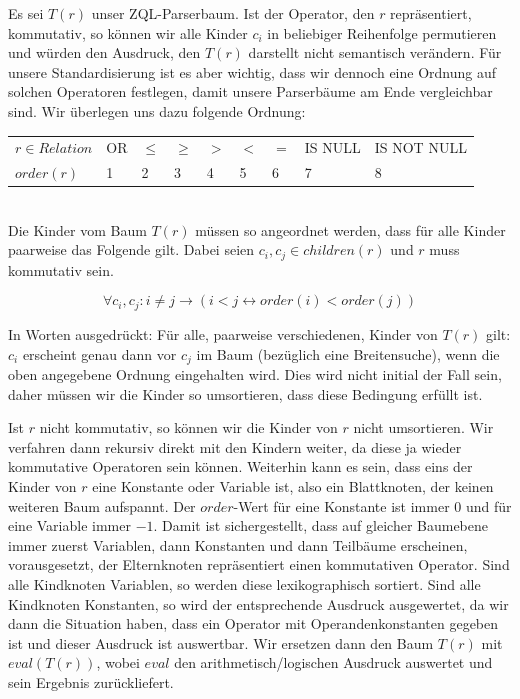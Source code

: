 Es sei $T(r)$ unser ZQL-Parserbaum. Ist der Operator, den $r$ repräsentiert, kommutativ, so können wir alle Kinder $c_i$ in beliebiger Reihenfolge permutieren und würden den Ausdruck, den $T(r)$ darstellt nicht semantisch verändern. Für unsere Standardisierung ist es aber wichtig, dass wir dennoch eine Ordnung auf solchen Operatoren festlegen, damit unsere Parserbäume am Ende vergleichbar sind. Wir überlegen uns dazu folgende Ordnung: 

\begin{tabular}{|lllllllll|}
\hline
$r\in \textit{Relation}$ & OR & $\le$ & $\ge$ & $>$ & $<$ & $=$ & IS NULL & IS NOT NULL  \\
$\textit{order}(r)$ & 1 & 2 & 3 & 4 & 5 & 6 & 7 & 8\\ 
\hline
\end{tabular}\\

Die Kinder vom Baum $T(r)$ müssen so angeordnet werden, dass für alle Kinder paarweise das Folgende gilt. Dabei seien $c_i,c_j\in\mathit{children}(r)$ und $r$ muss kommutativ sein.

$$\forall c_i,c_j : i\neq j \to  ( i<j \leftrightarrow order(i) < order(j) ) $$

In Worten ausgedrückt: Für alle, paarweise verschiedenen, Kinder von $T(r)$ gilt: $c_i$ erscheint genau dann vor $c_j$ im Baum (bezüglich eine Breitensuche), wenn die oben angegebene Ordnung eingehalten wird. Dies wird nicht initial der Fall sein, daher müssen wir die Kinder so umsortieren, dass diese Bedingung erfüllt ist. 

Ist $r$ nicht kommutativ, so können wir die Kinder von $r$ nicht umsortieren. Wir verfahren dann rekursiv direkt mit den Kindern weiter, da diese ja wieder kommutative Operatoren sein können. Weiterhin kann es sein, dass eins der Kinder von $r$ eine Konstante oder Variable ist, also ein Blattknoten, der keinen weiteren Baum aufspannt. Der $\mathit{order}$-Wert für eine Konstante ist immer 0 und für eine Variable immer $-1$. Damit ist sichergestellt, dass auf gleicher Baumebene immer zuerst Variablen, dann Konstanten und dann Teilbäume erscheinen, vorausgesetzt, der Elternknoten repräsentiert einen kommutativen Operator.
Sind alle Kindknoten Variablen, so werden diese lexikographisch sortiert. Sind alle Kindknoten Konstanten, so wird der entsprechende Ausdruck ausgewertet, da wir dann die Situation haben, dass ein Operator mit Operandenkonstanten gegeben ist und dieser Ausdruck ist auswertbar. Wir ersetzen dann den Baum $T(r)$ mit $eval(T(r))$, wobei $eval$ den arithmetisch/logischen Ausdruck auswertet und sein Ergebnis zurückliefert.

